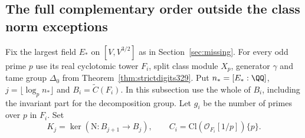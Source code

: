 \documentclass[a4paper,11pt]{article}
\theoremstyle{definition}
\theoremstyle{remark}
\numberwithin{equation}{section}
\begin{document}
\subsection{The full complementary order outside the class norm exceptions}\label{sec:fullnorm341}
Fix the largest field $E_*$ on $[V,V^{3/2}]$ as in
Section~\ref{sec:missing}. For every odd prime $p$ use its real
cyclotomic tower $F_i$, split class module $X_p$, generator $\gamma$
and tame group $\Delta_0$ from Theorem~\ref{thm:strictdigits329}.
Put $n_*=[E_*:\QQ]$, $j=\lfloor\log_p n_*\rfloor$ and
$B_i=\widetilde C(F_i)$. In this subsection use the whole of $B_i$,
including the invariant part for the decomposition group. Let
$g_i$ be the number of primes over $p$ in $F_i$. Set
\[
 K_j=\ker(\mathrm N:B_{j+1}\longrightarrow B_j),\qquad
 C_i=\mathrm{Cl}(\mathcal O_{F_i}[1/p])\{p\}.
\]
\end{document}
